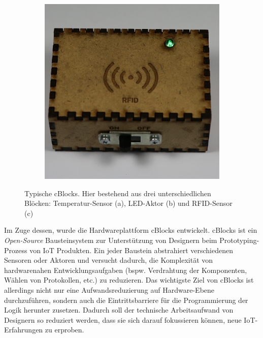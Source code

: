\begin{figure}[ht]
\begin{subfigure}[b]{0.3\textwidth}
        \caption{}
        \label{fig:tiger}
    \end{subfigure}
    \quad
    \begin{subfigure}[b]{0.3\textwidth}
        \includegraphics[width=1\linewidth]{bilder/chapter1/RFID.png}
        \caption{}
        \label{fig:mouse}
    \end{subfigure}
    \caption{Typische \acp{cBlock}. Hier bestehend aus drei unterschiedlichen Blöcken: Temperatur-Sensor (a),  LED-Aktor (b) und RFID-Sensor (c)}
    \label{fig:cblockfoto}
\end{figure}

Im Zuge dessen, wurde die Hardwareplattform \acp{cBlock} entwickelt. \acp{cBlock} ist ein \textit{Open-Source} Bausteinsystem zur Unterstützung von Designern beim Prototyping-Prozess von \ac{IoT} Produkten. Ein jeder Baustein abstrahiert verschiedenen Sensoren oder Aktoren und versucht dadurch, die Komplexität von hardwarenahen Entwicklungsaufgaben (bspw. Verdrahtung der Komponenten, Wählen von Protokollen, etc.) zu reduzieren. Das wichtigste Ziel von \acp{cBlock} ist allerdings nicht nur eine Aufwandsreduzierung auf Hardware-Ebene durchzuführen, sondern auch die Eintrittsbarriere für die Programmierung der Logik herunter zusetzen. Dadurch soll der technische Arbeitsaufwand von Designern so reduziert werden, dass sie sich darauf fokussieren können, neue \ac{IoT}-Erfahrungen zu erproben.

